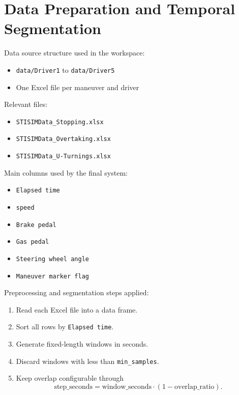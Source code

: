 \documentclass[11pt,a4paper]{article}
\begin{document}
\section{Data Preparation and Temporal Segmentation}
Data source structure used in the workspace:
\begin{itemize}
    \item \texttt{data/Driver1} to \texttt{data/Driver5}
    \item One Excel file per maneuver and driver
\end{itemize}

Relevant files:
\begin{itemize}
    \item \texttt{STISIMData\_Stopping.xlsx}
    \item \texttt{STISIMData\_Overtaking.xlsx}
    \item \texttt{STISIMData\_U-Turnings.xlsx}
\end{itemize}

Main columns used by the final system:
\begin{itemize}
    \item \texttt{Elapsed time}
    \item \texttt{speed}
    \item \texttt{Brake pedal}
    \item \texttt{Gas pedal}
    \item \texttt{Steering wheel angle}
    \item \texttt{Maneuver marker flag}
\end{itemize}

Preprocessing and segmentation steps applied:
\begin{enumerate}
    \item Read each Excel file into a data frame.
    \item Sort all rows by \texttt{Elapsed time}.
    \item Generate fixed-length windows in seconds.
    \item Discard windows with less than \texttt{min\_samples}.
    \item Keep overlap configurable through
    \[
    \text{step\_seconds} = \text{window\_seconds} \cdot (1 - \text{overlap\_ratio}).
    \]
\end{enumerate}
\end{document}
